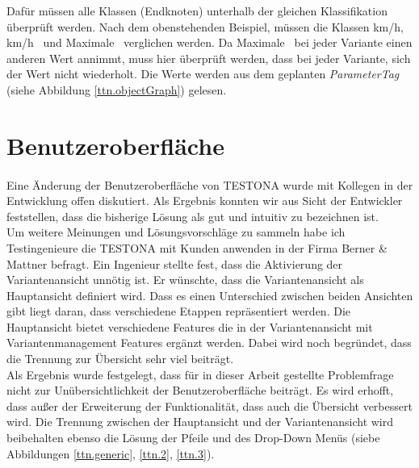 Dafür müssen alle Klassen (Endknoten) unterhalb der gleichen Klassifikation überprüft werden. Nach dem obenstehenden Beispiel, müssen die Klassen  km/h\grqq ,  km/h\grqq~ und \glqq Maximale\grqq~ verglichen werden. Da \glqq Maximale\grqq~ bei jeder Variante einen anderen Wert annimmt, muss hier überprüft werden, dass bei jeder Variante, sich der Wert nicht wiederholt. Die Werte werden aus dem geplanten \textit{ParameterTag} (siehe Abbildung \ref{ttn.objectGraph}) gelesen.

\newpage
\section{Benutzeroberfläche}
\paragraph{}

Eine Änderung der Benutzeroberfläche von TESTONA wurde mit Kollegen in der Entwicklung offen diskutiert. Als Ergebnis konnten wir aus Sicht der Entwickler feststellen, dass die bisherige Lösung als gut und intuitiv zu bezeichnen ist.\\

Um weitere Meinungen und Lösungsvorschläge zu sammeln habe ich Testingenieure die TESTONA mit Kunden anwenden in der Firma Berner \& Mattner befragt. Ein Ingenieur stellte fest, dass die Aktivierung der Variantenansicht unnötig ist. Er wünschte, dass die Variantenansicht als Hauptansicht definiert wird. 
Dass es einen Unterschied zwischen beiden Ansichten gibt liegt daran, dass verschiedene Etappen repräsentiert werden. Die Hauptansicht bietet verschiedene Features die in der Variantenansicht mit Variantenmanagement Features ergänzt werden. Dabei wird noch begründet, dass die Trennung zur Übersicht sehr viel beiträgt.\\

Als Ergebnis wurde festgelegt, dass für in dieser Arbeit gestellte Problemfrage nicht zur Unübersichtlichkeit der Benutzeroberfläche beiträgt. Es wird erhofft, dass außer der Erweiterung der Funktionalität, dass auch die Übersicht verbessert wird. Die Trennung zwischen der Hauptansicht und der Variantenansicht wird beibehalten ebenso die Lösung der Pfeile und des Drop-Down Menüs (siebe Abbildungen \ref{ttn.generic}, \ref{ttn.2}, \ref{ttn.3}).
